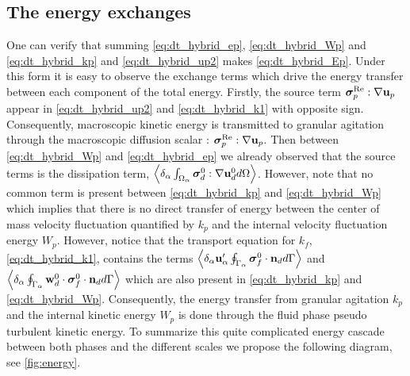 \subsection{The energy exchanges}

One can verify that summing \ref{eq:dt_hybrid_ep}, \ref{eq:dt_hybrid_Wp} and \ref{eq:dt_hybrid_kp} and \ref{eq:dt_hybrid_up2} makes \ref{eq:dt_hybrid_Ep}.  
Under this form it is easy to observe the exchange terms which drive the energy transfer between each component of the total energy. 
Firstly, the source term $\bm{\sigma}_p^\text{Re} :\mathbf{\nabla} \textbf{u}_p$ appear in \ref{eq:dt_hybrid_up2} and \ref{eq:dt_hybrid_k1} with opposite sign. 
Consequently, macroscopic kinetic energy is transmitted to granular agitation through the macroscopic diffusion scalar : $\bm{\sigma}_p^\text{Re} :\mathbf{\nabla} \textbf{u}_p$. 
Then between \ref{eq:dt_hybrid_Wp} and \ref{eq:dt_hybrid_ep} we already observed that the source terms is the dissipation term,  $\left<\delta_\alpha \int_{\Omega_\alpha} \bm{\sigma}_d^0:\mathbf{\nabla} \textbf{u}_d^0 d\Omega\right>$.
However, note that no common term is present between \ref{eq:dt_hybrid_kp} and \ref{eq:dt_hybrid_Wp} which implies that there is no direct transfer of energy between the center of mass velocity fluctuation quantified by $k_p$ and the internal velocity fluctuation energy $W_p$. 
However, notice that the transport equation for $k_f$, \ref{eq:dt_hybrid_k1}, contains the terms $\left<\delta_\alpha \textbf{u}_\alpha' \oint_{\Gamma_\alpha} \bm{\sigma}_f^0 \cdot \textbf{n}_d d\Gamma\right>$ and $\left<\delta_\alpha \oint_{\Gamma_\alpha} \textbf{w}_d^0 \cdot \bm{\sigma}_f^0 \cdot \textbf{n}_d d\Gamma\right>$ which are also present in \ref{eq:dt_hybrid_kp} and \ref{eq:dt_hybrid_Wp}. 
Consequently, the energy transfer from granular agitation $k_p$ and the internal kinetic energy $W_p$ is done through the fluid phase pseudo turbulent kinetic energy. 
To summarize this quite complicated energy cascade between both phases and the different scales we propose the following diagram, see \ref{fig:energy}. 
